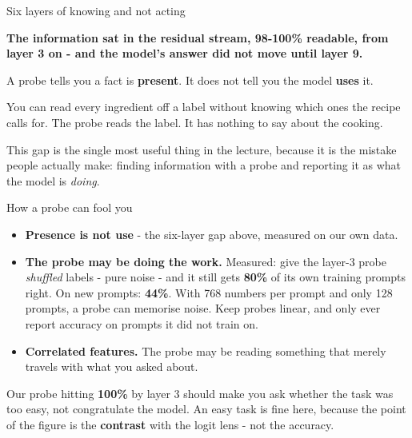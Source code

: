 \documentclass[aspectratio=169]{beamer}
\newcommand{\keybox}[1]{%
  \begin{tcolorbox}[colback=armblue!8, colframe=armblue, boxrule=0.6pt, arc=2pt]
  #1
  \end{tcolorbox}}
\newcommand{\trapbox}[1]{%
  \begin{tcolorbox}[colback=armred!8, colframe=armred, boxrule=0.6pt, arc=2pt]
  #1
  \end{tcolorbox}}
\newcommand{\watchbox}[1]{%
  \begin{tcolorbox}[colback=armorange!12, colframe=armorange, boxrule=0.6pt, arc=2pt]
  #1
  \end{tcolorbox}}
\begin{document}
\begin{frame}{Six layers of knowing and not acting}
  \vspace{1.0em}
  \trapbox{\textbf{The information sat in the residual stream, 98-100\% readable, from layer 3
  on - and the model's answer did not move until layer 9.}}

  \vspace{1.0em}
  \keybox{A probe tells you a fact is \textbf{present}. It does not tell you the model
  \textbf{uses} it.}

  \vspace{1.0em}
  You can read every ingredient off a label without knowing which ones the recipe calls for. The
  probe reads the label. It has nothing to say about the cooking.

  \vspace{0.9em}
  {\footnotesize This gap is the single most useful thing in the lecture, because it is the
  mistake people actually make: finding information with a probe and reporting it as what the
  model is \emph{doing}.}
\end{frame}

\begin{frame}{How a probe can fool you}
  \vspace{0.5em}
  \begin{itemize}
    \item \textbf{Presence is not use} - the six-layer gap above, measured on our own data.
    \item \textbf{The probe may be doing the work.} Measured: give the layer-3 probe
      \emph{shuffled} labels - pure noise - and it still gets \textbf{80\%} of its own training
      prompts right. On new prompts: \textbf{44\%}. With 768 numbers per prompt and only 128
      prompts, a probe can memorise noise. Keep probes linear, and only ever report accuracy on
      prompts it did not train on.
    \item \textbf{Correlated features.} The probe may be reading something that merely travels
      with what you asked about.
  \end{itemize}

  \vspace{0.8em}
  \watchbox{Our probe hitting \textbf{100\%} by layer 3 should make you ask whether the task was
  too easy, not congratulate the model. An easy task is fine here, because the point of the
  figure is the \textbf{contrast} with the logit lens - not the accuracy.}
\end{frame}
\end{document}
